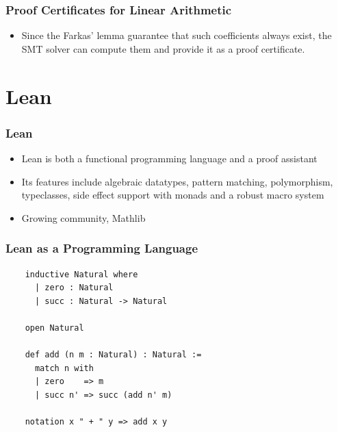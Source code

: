 \documentclass[usepdftitle=false,aspectratio=169,usenames,dvipsnames]{beamer}
\newcommand\vitem{\vfill\item}
\begin{document}
\begin{frame}
  \frametitle{Proof Certificates for Linear Arithmetic}
  \begin{itemize}
    \item Since the Farkas' lemma guarantee that such coefficients always exist, the SMT solver can compute them and provide it as a proof certificate.
  \end{itemize}
\end{frame}

\section{Lean}

\begin{frame}
  \frametitle{Lean}
  \begin{itemize}
    \item Lean is both a functional programming language and a proof assistant
    \vitem Its features include algebraic datatypes, pattern matching, polymorphism, typeclasses, side effect support with monads and a robust macro system
    \vitem Growing community, Mathlib
  \end{itemize}
\end{frame}

\begin{frame}[fragile]
  \frametitle{Lean as a Programming Language}
  \begin{verbatim}
    inductive Natural where
      | zero : Natural
      | succ : Natural -> Natural

    open Natural

    def add (n m : Natural) : Natural :=
      match n with
      | zero    => m
      | succ n' => succ (add n' m)

    notation x " + " y => add x y
  \end{verbatim}
\end{frame}
\end{document}
